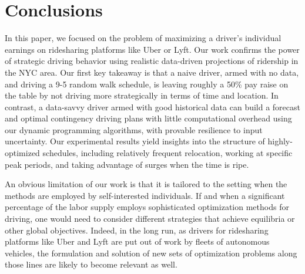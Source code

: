 
\section{Conclusions}
\label{sec:conclusions}
In this paper, we focused on the problem of 
maximizing a driver's individual earnings on ridesharing platforms like Uber or Lyft.
Our work confirms the power of strategic driving behavior %
using realistic data-driven projections
of ridership in the NYC area.  Our first key takeaway is that a naive driver,
armed with no data, and driving a 9-5 random walk schedule, is leaving 
roughly a 50\% pay raise on the table by not driving more strategically 
in terms of time and location.  In contrast, a data-savvy driver armed with
good historical data can build a forecast and optimal contingency driving plans 
with little computational overhead using 
our dynamic programming algorithms, with provable resilience to input
uncertainty.  Our experimental results yield insights into the
structure of highly-optimized schedules, including relatively frequent relocation,
working at specific peak periods, and taking advantage of 
surges when the time is ripe.  

An obvious limitation of our work is that it is tailored to the setting when the 
methods are employed by self-interested individuals.  If and when a 
significant percentage of the labor supply employs sophisticated optimization methods
for driving, one would need to consider different strategies that achieve equilibria
or other global objectives. %
Indeed, in the long run, as drivers for ridesharing 
platforms like Uber and Lyft are put out of work by fleets of autonomous vehicles, 
the formulation and solution of new sets of optimization problems along those lines
are likely to become relevant as well.



